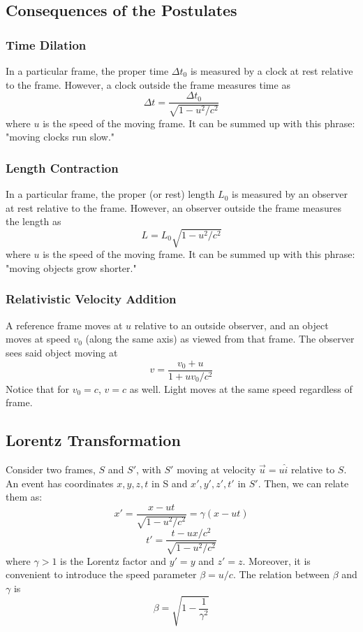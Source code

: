 \documentclass[../PhysicsFormulae.tex]{subfiles}
\begin{document}
\subsection{Consequences of the Postulates}
\subsubsection{Time Dilation}
In a particular frame, the proper time $\Delta t_0$ is measured by a clock at rest relative to the frame. However, a clock outside the frame measures time as 
\[ \Delta t = \frac{\Delta t_0}{\sqrt{1-u^2/c^2}} \] 
where $u$ is the speed of the moving frame. It can be summed up with this phrase: "moving clocks run slow."

\subsubsection{Length Contraction}
In a particular frame, the proper (or rest) length $L_0$ is measured by an observer at rest relative to the frame. However, an observer outside the frame measures the length as
\[ L = L_0 \sqrt{1-u^2/c^2} \] 
where $u$ is the speed of the moving frame. It can be summed up with this phrase: "moving objects grow shorter."

\subsubsection{Relativistic Velocity Addition}
A reference frame moves at $u$ relative to an outside observer, and an object moves at speed $v_0$ (along the same axis) as viewed from that frame. The observer sees said object moving at 
\[ v = \frac{v_0 + u}{1+uv_0/c^2} \] 
Notice that for $v_0=c$, $v=c$ as well. Light moves at the same speed regardless of frame. 

\subsection{Lorentz Transformation}
Consider two frames, $S$ and $S'$, with $S'$ moving at velocity $\vec{u}=u\hat{i}$ relative to $S$. An event has coordinates $x,y,z,t$ in S and $x',y',z',t'$ in $S'$. Then, we can relate them as:
\[ x' = \frac{x-ut}{\sqrt{1-u^2/c^2}} = \gamma (x-ut) \]
\[ t' = \frac{t-ux/c^2}{\sqrt{1-u^2/c^2}} \]
where $\gamma > 1$ is the Lorentz factor and $y'=y$ and $z'=z$. Moreover, it is convenient to introduce the speed parameter $\beta = u/c$. The relation between $\beta$ and $\gamma$ is 
\[ \beta = \sqrt{1 - \frac{1}{\gamma^2}} \]
\end{document}

